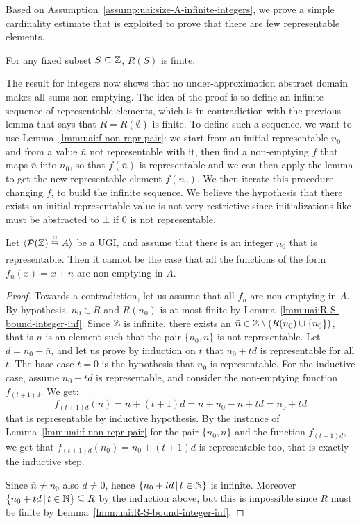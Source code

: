 Based on Assumption~\ref{assump:uai:size-A-infinite-integers}, we prove a simple cardinality estimate that is exploited to prove that there are few representable elements.
\begin{lemma}\label{lmm:uai:R-S-bound-integer-inf}
	For any fixed subset $S \subseteq \mathbb{Z}$, $R(S)$ is finite.
\end{lemma}
The result for integers now shows that no under-approximation abstract domain makes all sums non-emptying. The idea of the proof is to define an infinite sequence of representable elements, which is in contradiction with the previous lemma that says that $R = R(\emptyset)$ is finite.
To define such a sequence, we want to use Lemma~\ref{lmm:uai:f-non-repr-pair}: we start from an initial representable $n_0$ and from a value $\bar{n}$ not representable with it, then find a non-emptying $f$ that maps $\bar{n}$ into $n_0$, so that $f(\bar{n})$ is representable and we can then apply the lemma to get the new representable element $f(n_0)$. We then iterate this procedure, changing $f$, to build the infinite sequence.
We believe the hypothesis that there exists an initial representable value is not very restrictive since initializations like  must be abstracted to $\bot$ if $0$ is not representable.
\begin{prop}\label{prop:uai:ne-sum-nonexsistence-inf}
	Let $\ugi{\pow(\setZ)}{\alpha}{A}$ be a UGI, and assume that there is an integer $n_0$ that is representable. Then it cannot be the case that all the functions of the form $f_n(x) = x + n$ are non-emptying in $A$.
\end{prop}
\begin{proof}%
	Towards a contradiction, let us assume that all $f_n$ are non-emptying in $A$.
	By hypothesis, $n_0 \in R$ and $R(n_0)$ is at most finite by Lemma~\ref{lmm:uai:R-S-bound-integer-inf}. Since $\mathbb{Z}$ is infinite, there exists an $\bar{n} \in \mathbb{Z} \setminus (R(n_0) \cup \{ n_0 \})$, that is $\bar{n}$ is an element such that the pair $\{ n_0, \bar{n} \}$ is not representable.
	Let $d = n_0 - \bar{n}$, and let us prove by induction on $t$ that $n_0 + t d$ is representable for all $t$. The base case $t = 0$ is the hypothesis that $n_0$ is representable. For the inductive case, assume $n_0 + t d$ is representable, and consider the non-emptying function$f_{(t+1) d}$. We get:
	\begin{equation*}
		f_{(t+1) d}(\bar{n}) = \bar{n} + (t+1) d = \bar{n} + n_0 - \bar{n} + t d = n_0 + t d
	\end{equation*}
	that is representable by inductive hypothesis.
	By the instance of Lemma~\ref{lmm:uai:f-non-repr-pair} for the pair $\{ n_0, \bar{n} \}$ and the function $f_{(t+1) d}$, we get that $f_{(t+1) d}(n_0) = n_0 + (t+1) d$ is representable too, that is exactly the inductive step.

	Since $\bar{n} \neq n_0$ also $d \neq 0$, hence $\{ n_0 + t d \,\vert\, t \in \mathbb{N} \}$ is infinite.
	Moreover $\{ n_0 + t d \,\vert\, t \in \mathbb{N} \} \subseteq R$ by the induction above, but this is impossible since $R$ must be finite by Lemma~\ref{lmm:uai:R-S-bound-integer-inf}.
\end{proof}
